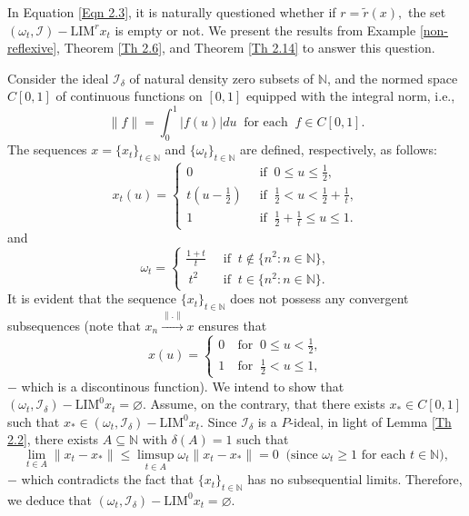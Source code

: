 \documentclass[reqno]{amsart}
\begin{document}
{In Equation \ref{Eqn 2.3}, it is naturally questioned whether if $r=\tilde{r}(x),$ the set $	(\omega_t,\mathcal{I})-\text{LIM}^{r} x_t$ is empty or not. We present the results from Example \ref{non-reflexive}, Theorem \ref{Th 2.6}, and Theorem \ref{Th 2.14} to answer this question.


\begin{example}\label{non-reflexive}	Consider the ideal $\mathcal{I}_{\delta}$ of natural density zero subsets of $\mathbb{N}$, and the normed space $C[0,1]$ of continuous functions on $[0,1]$ equipped with the integral norm, i.e., $$\|f\|=\int_{0}^{1}|f(u)| du ~\mbox{ for each } ~f\in C[0,1].$$
	The sequences $x=\{x_t\}_{t\in\mathbb{N}}$ and $\{\omega_t\}_{t\in\mathbb{N}}$ are defined, respectively, as follows:
	$$x_t(u)=
	\begin{cases}
		0 &~\mbox{ if }~0\leq u\leq\frac{1}{2},\\ 
		t(u-\frac{1}{2}) &~\mbox{ if }~ \frac{1}{2}<u<\frac{1}{2}+\frac{1}{t},\\
		1 &~\mbox{ if }~ \frac{1}{2}+\frac{1}{t}\leq u\leq 1.
	\end{cases}$$  
	and $$\omega_t=
	\begin{cases}
		\frac{1+t}{t} &~\mbox{ if }~t\notin\{n^2:n\in\mathbb{N}\},\\
		~t^2 &~ \mbox{ if }~t\in\{n^2:n\in\mathbb{N}\}.
	\end{cases}$$
	It is evident that the sequence $\{x_t\}_{t\in\mathbb{N}}$ does not possess any convergent subsequences (note that $x_n\xrightarrow{\|.\|} x$ ensures that
	\begin{equation*} x(u)=
		\begin{cases}
			0&~\mbox{for }~0\leq u<\frac{1}{2},\\
			1&~\mbox{for }~\frac{1}{2}<u\leq 1,
	\end{cases}\end{equation*}
	$-$ which is a discontinous function). We intend to show that $(\omega_t,\mathcal{I}_{\delta})-\text{LIM}^{0} x_t=\varnothing.$ Assume, on the contrary, that there exists $x_*\in C[0,1]$ such that  $x_*\in (\omega_t,\mathcal{I}_{\delta})-\text{LIM}^{0} x_t$. Since $\mathcal{I}_{\delta}$ is a $P$-ideal, in light of Lemma \ref{Th 2.2}, there exists $A\subseteq\mathbb{N}$ with $\delta(A)=1$ such that 
	$$
	\lim_{t\in A} \|x_t-x_*\|\leq \limsup_{t\in A} \omega_t\|x_t-x_*\| =0~\mbox{ (since  $\omega_t\geq 1$ for each $t\in\mathbb{N}$)},
	$$
	$-$ which contradicts the fact that $\{x_t\}_{t\in\mathbb{N}}$ has no subsequential limits. Therefore, we deduce that $(\omega_t,\mathcal{I}_{\delta})-\text{LIM}^{0} x_t=\varnothing$.
	

\end{example}}
\end{document}
